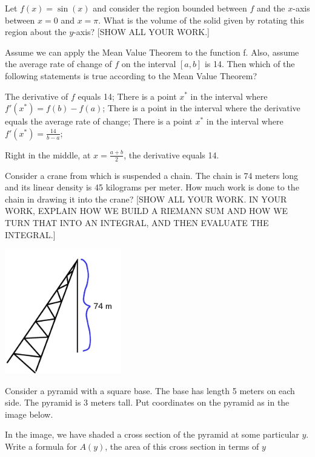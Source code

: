 \documentclass[10pt]{exam}
\begin{document}
\begin{questions}
\question 

Let $f(x) = \sin(x)$ and consider the region bounded between $f$ and the $x$-axis between $x=0$ and $x=\pi$.  What is the volume of the solid given by rotating this region about the $y$-axis? [SHOW ALL YOUR WORK.]



\question  Assume we can apply the Mean Value Theorem to the function f.  Also, assume the average rate of change of $f$ on the interval $[a,b]$ is 14.  Then which of the following statements is true according to the Mean Value Theorem?

\begin{choices}  %
\choice The derivative of $f$ equals 14;
\choice There is a point $x^*$ in the interval where $f'(x^*) = f(b)-f(a)$;
\choice There is a point in the interval where the derivative equals the average rate of change; %
\choice There is a point $x^*$ in the interval where $f'(x^*) = \frac{14}{b-a}$;

\choice Right in the middle, at $x=\frac{a+b}{2}$, the derivative equals 14.
	
\end{choices}


\question Consider a crane from which is suspended a chain.  The chain is 74 meters long and its linear density is 45 kilograms per meter.  How much work is done to the chain in drawing it into the crane?  [SHOW ALL YOUR WORK.  IN YOUR WORK, EXPLAIN HOW WE BUILD A RIEMANN SUM AND HOW WE TURN THAT INTO AN INTEGRAL, AND THEN EVALUATE THE INTEGRAL.]


\includegraphics[width=2in]{images/work_problem}




\question \label{pyr1} Consider a pyramid with a square base.  The base has length 5 meters on each side.  The pyramid is 3 meters tall.  Put coordinates on the pyramid as in the image below.

In the image, we have shaded a cross section of the pyramid at some particular $y$.  Write a formula for $A(y)$, the area of this cross section in terms of $y$ 


\end{questions}
\end{document}
